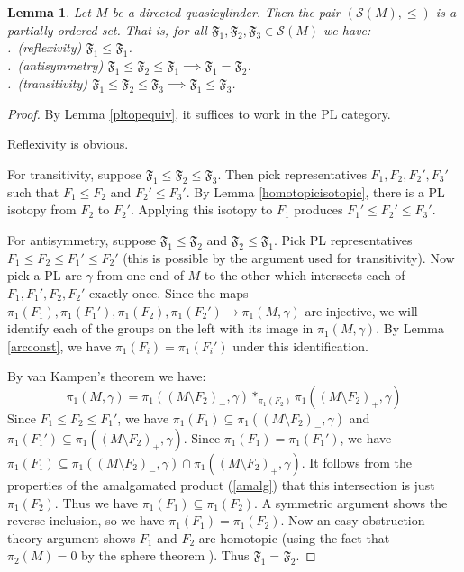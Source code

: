 \documentclass[12pt]{article}
\theoremstyle{plain}
\newtheorem{lemma}[theorem]{Lemma}
\theoremstyle{definition}
\theoremstyle{remark}
\numberwithin{equation}{section}
\begin{document}
\begin{lemma}\label{posetcomp}
Let $M$ be a directed quasicylinder.  Then the pair $(\mathcal S(M),\leq)$ is a partially-ordered set.  That is, for all $\mathfrak F_1,\mathfrak F_2,\mathfrak F_3\in\mathcal S(M)$ we have:\\
.\ (reflexivity) $\mathfrak F_1\leq\mathfrak F_1$.\\
.\ (antisymmetry) $\mathfrak F_1\leq\mathfrak F_2\leq\mathfrak F_1\implies\mathfrak F_1=\mathfrak F_2$.\\
.\ (transitivity) $\mathfrak F_1\leq\mathfrak F_2\leq\mathfrak F_3\implies\mathfrak F_1\leq\mathfrak F_3$.
\end{lemma}

\begin{proof}
By Lemma \ref{pltopequiv}, it suffices to work in the PL category.

Reflexivity is obvious.

For transitivity, suppose $\mathfrak F_1\leq\mathfrak F_2\leq\mathfrak F_3$.  Then pick representatives $F_1,F_2,F_2',F_3'$ such that $F_1\leq F_2$ and $F_2'\leq F_3'$.  By Lemma \ref{homotopicisotopic}, there is a PL isotopy from $F_2$ to $F_2'$.  Applying this isotopy to $F_1$ produces $F_1'\leq F_2'\leq F_3'$.

For antisymmetry, suppose $\mathfrak F_1\leq\mathfrak F_2$ and $\mathfrak F_2\leq\mathfrak F_1$.  Pick PL representatives $F_1\leq F_2\leq F_1'\leq F_2'$ (this is possible by the argument used for transitivity).  Now pick a PL arc $\gamma$ from one end of $M$ to the other which intersects each of $F_1,F_1',F_2,F_2'$ exactly once.  Since the maps $\pi_1(F_1),\pi_1(F_1'),\pi_1(F_2),\pi_1(F_2')\to\pi_1(M,\gamma)$ are injective, we will identify each of the groups on the left with its image in $\pi_1(M,\gamma)$.  By Lemma \ref{arcconst}, we have $\pi_1(F_i)=\pi_1(F_i')$ under this identification.

By van Kampen's theorem we have:
\begin{equation}\label{amalg}
\pi_1(M,\gamma)=\pi_1((M\setminus F_2)_-,\gamma)\mathop\ast_{\pi_1(F_2)}\pi_1((M\setminus F_2)_+,\gamma)
\end{equation}
Since $F_1\leq F_2\leq F_1'$, we have $\pi_1(F_1)\subseteq\pi_1((M\setminus F_2)_-,\gamma)$ and $\pi_1(F_1')\subseteq\pi_1((M\setminus F_2)_+,\gamma)$.  Since $\pi_1(F_1)=\pi_1(F_1')$, we have $\pi_1(F_1)\subseteq\pi_1((M\setminus F_2)_-,\gamma)\cap\pi_1((M\setminus F_2)_+,\gamma)$.  It follows from the properties of the amalgamated product (\ref{amalg}) that this intersection is just $\pi_1(F_2)$.  Thus we have $\pi_1(F_1)\subseteq\pi_1(F_2)$.  A symmetric argument shows the reverse inclusion, so we have $\pi_1(F_1)=\pi_1(F_2)$.  Now an easy obstruction theory argument shows $F_1$ and $F_2$ are homotopic (using the fact that $\pi_2(M)=0$ by the sphere theorem \cite{papa}).  Thus $\mathfrak F_1=\mathfrak F_2$.
\end{proof}
\end{document}
